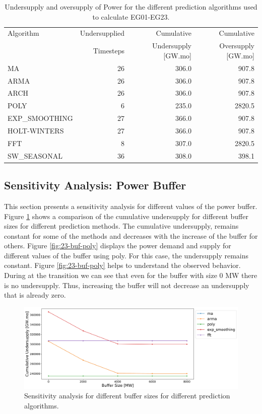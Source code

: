 \documentclass[11pt]{article}
\begin{document}
\begin{table}[H]
	\centering
	\caption{Undersupply and oversupply of Power for the different prediction algorithms used to calculate EG01-EG23.}
	\label{tab:23-power}
	\begin{tabularx}{\textwidth}{lRRR}
		\hline
		Algorithm & Undersupplied & Cumulative  & Cumulative \\
		& Timesteps     & Undersupply [GW.mo]  & Oversupply [GW.mo] \\ \hline
		MA        & 26 	& 306.0 &  907.8   \\ 
		ARMA      & 26 	& 306.0 &  907.8   \\ 
		ARCH      & 26 	& 306.0 &  907.8   \\ 
		POLY      &  6 	& 235.0 &  2820.5  \\ 
		EXP\_SMOOTHING 	& 27 & 366.0 & 907.8 \\ 
		HOLT-WINTERS  	& 27 & 366.0 & 907.8 \\ 
		FFT       & 8	& 307.0	& 2820.5 \\ 
		SW\_SEASONAL    & 36 & 308.0 & 398.1	\\ \hline
	\end{tabularx}
\end{table}

\subsection{Sensitivity Analysis: Power Buffer}

This section presents a sensitivity analysis for different values of the power buffer. 
Figure \ref{fig:23-buff} shows a comparison of the cumulative undersupply for 
different buffer sizes for different prediction methods. 
The cumulative undersupply, remains constant for some of the methods and 
decreases with the increase of the buffer for others. 
Figure \ref{fig:23-buf-poly} displays the power demand and supply for
different values of the buffer using poly. 
For this case, the undersupply remains constant. 
Figure \ref{fig:23-buf-poly} helps to understand the observed behavior. 
During at the transition we can see that even for the buffer with size 
0 MW there is no undersupply. 
Thus, increasing the buffer will not decrease an undersupply that is 
already zero.

\begin{figure}[H]
	\centering
	\includegraphics[width=\textwidth]{23-figures/23-sens-buffer.png} 
	\hfill
	\caption{Sensitivity analysis for different buffer sizes for different prediction algorithms.}
	\label{fig:23-buff}
\end{figure}
\end{document}
